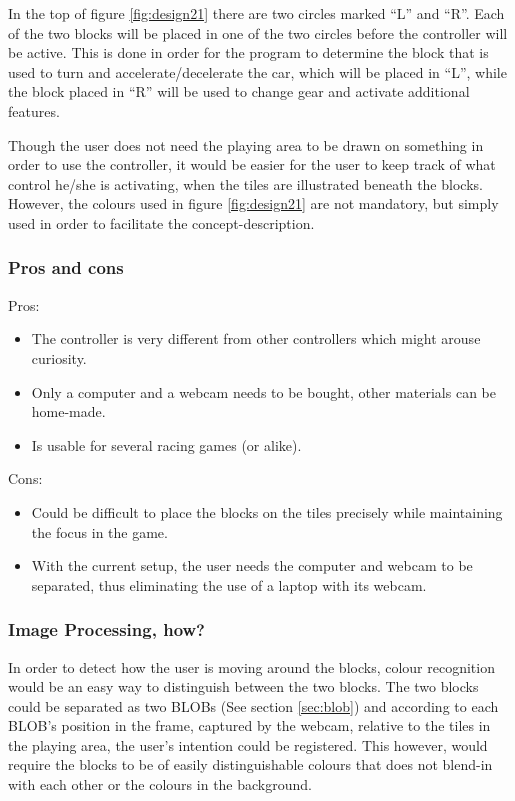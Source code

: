 In the top of figure \ref{fig:design21} there are two circles marked “L” and “R”. Each of the two blocks will be placed in one of the two circles before the controller will be active. This is done in order for the program to determine the block that is used to turn and accelerate/decelerate the car, which will be placed in “L”, while the block placed in “R” will be used to change gear and activate additional features.

Though the user does not need the playing area to be drawn on something in order to use the controller, it would be easier for the user to keep track of what control he/she is activating, when the tiles are illustrated beneath the blocks. However, the colours used in figure \ref{fig:design21} are not mandatory, but simply used in order to facilitate the concept-description.
\bigskip

\subsubsection*{Pros and cons}
Pros:
\begin{itemize}
\item The controller is very different from other controllers which might arouse curiosity.
\item Only a computer and a webcam needs to be bought, other materials can be home-made.
\item Is usable for several racing games (or alike).
\end{itemize}
Cons:
\begin{itemize}
\item Could be difficult to place the blocks on the tiles precisely while maintaining the focus in the game.
\item With the current setup, the user needs the computer and webcam to be separated, thus eliminating the use of a laptop with its webcam.
\end{itemize}

\subsubsection*{Image Processing, how?}
In order to detect how the user is moving around the blocks, colour recognition would be an easy way to distinguish between the two blocks. The two blocks could be separated as two BLOBs (See section \ref{sec:blob}) and according to each BLOB’s position in the frame, captured by the webcam, relative to the tiles in the playing area, the user’s intention could be registered. This however, would require the blocks to be of easily distinguishable colours that does not blend-in with each other or the colours in the background.